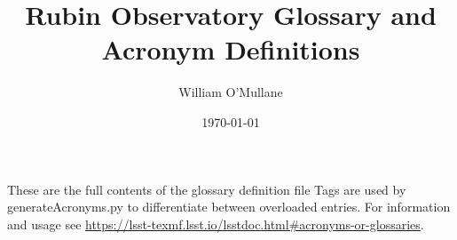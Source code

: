\documentclass[DM,,authoryear,toc]{lsstdoc}
\title[Glossary]{Rubin Observatory Glossary and Acronym Definitions}
\author{
William O'Mullane
}
\date{\today}
\begin{document}
\mkshorttitle

These are the full contents of the glossary definition file
Tags are used by generateAcronyms.py to differentiate between overloaded entries.
For information and usage see \url{https://lsst-texmf.lsst.io/lsstdoc.html#acronyms-or-glossaries}.



\end{document}
